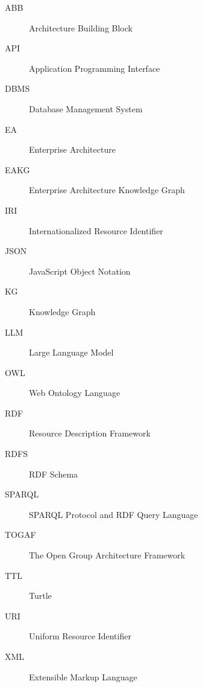 \begin{description}
    \item[ABB] Architecture Building Block
    \item[API] Application Programming Interface
    \item[DBMS] Database Management System
    \item[EA] Enterprise Architecture
    \item[EAKG] Enterprise Architecture Knowledge Graph
    \item[IRI] Internationalized Resource Identifier
    \item[JSON] JavaScript Object Notation
    \item[KG] Knowledge Graph
    \item[LLM] Large Language Model
    \item[OWL] Web Ontology Language
    \item[RDF] Resource Description Framework
    \item[RDFS] RDF Schema
    \item[SPARQL] SPARQL Protocol and RDF Query Language
    \item[TOGAF] The Open Group Architecture Framework
    \item[TTL] Turtle
    \item[URI] Uniform Resource Identifier
    \item[XML] Extensible Markup Language
\end{description}
